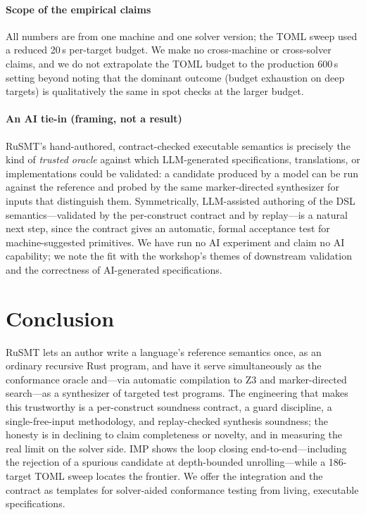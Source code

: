 \documentclass[sigplan,review,anonymous]{acmart}
\theoremstyle{definition}
\theoremstyle{remark}
\newcommand{\rusmt}{RuSMT}
\newcommand{\imp}{IMP}
\newcommand{\toml}{TOML}
\begin{document}
\paragraph{Scope of the empirical claims}
All numbers are from one machine and one solver version; the \toml{} sweep used a
reduced 20\,s per-target budget. We make no cross-machine or cross-solver claims,
and we do not extrapolate the \toml{} budget to the production 600\,s setting
beyond noting that the dominant outcome (budget exhaustion on deep targets) is
qualitatively the same in spot checks at the larger budget.

\paragraph{An AI tie-in (framing, not a result)}
\rusmt{}'s hand-authored, contract-checked executable semantics is precisely the
kind of \emph{trusted oracle} against which LLM-generated specifications,
translations, or implementations could be validated: a candidate produced by a
model can be run against the reference and probed by the same marker-directed
synthesizer for inputs that distinguish them. Symmetrically, LLM-assisted
authoring of the DSL semantics---validated by the per-construct contract and by
replay---is a natural next step, since the contract gives an automatic, formal
acceptance test for machine-suggested primitives. We have run no AI experiment and
claim no AI capability; we note the fit with the workshop's themes of downstream
validation and the correctness of AI-generated specifications.

\section{Conclusion}
\label{sec:concl}

\rusmt{} lets an author write a language's reference semantics once, as an ordinary
recursive Rust program, and have it serve simultaneously as the conformance oracle
and---via automatic compilation to Z3 and marker-directed search---as a synthesizer
of targeted test programs. The engineering that makes this trustworthy is a
per-construct soundness contract, a guard discipline, a single-free-input
methodology, and replay-checked synthesis soundness; the honesty is in declining to
claim completeness or novelty, and in measuring the real limit on the solver side.
\imp{} shows the loop closing end-to-end---including the rejection of a spurious
candidate at depth-bounded unrolling---while a 186-target \toml{} sweep locates the
frontier. We offer the integration and the contract as templates for solver-aided
conformance testing from living, executable specifications.



\end{document}
